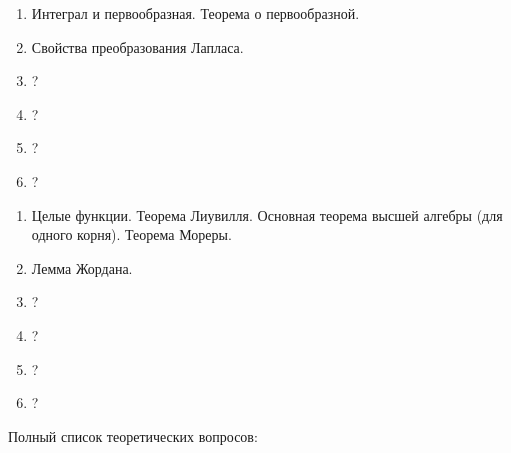 \documentclass{article}
\newcounter{ticket}[subsection]
\newenvironment{ticket}[1][]{\item[Билет \ifthenelse{\equal{#1}{}}{}{\setcounter{ticket}{#1}}\theticket\refstepcounter{ticket}:]\phantom{}\begin{enumerate}}{\end{enumerate}}
\begin{document}
\begin{description}
\begin{ticket}[15]
		\item Интеграл и первообразная. Теорема о первообразной.
		\item Свойства преобразования Лапласа.
		\item ?
		\item ?
		\item ?
		\item ?
	\end{ticket}
	\begin{ticket}[22]
		\item Целые функции. Теорема Лиувилля. Основная теорема высшей алгебры (для одного корня). Теорема Мореры.
		\item Лемма Жордана.
		\item ?
		\item ?
		\item ?
		\item ?
	\end{ticket}
\end{description}
Полный список теоретических вопросов:
\end{document}
